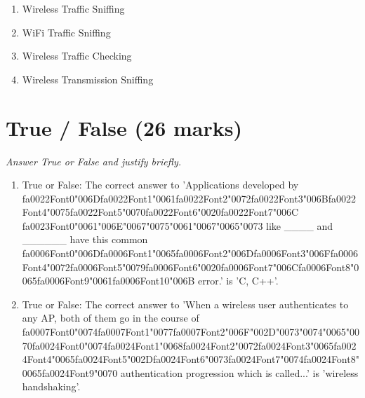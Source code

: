 \documentclass[12pt]{article}
\begin{document}
\begin{enumerate}[label=\arabic*.]
\begin{enumerate}[label=(\alph*)]
    \item Wireless Traffic Sniffing
    \item WiFi Traffic Sniffing
    \item Wireless Traffic Checking
    \item Wireless Transmission Sniffing
\end{enumerate}
\end{enumerate}

\section*{True / False (26 marks)}
\textit{Answer True or False and justify briefly.}
\begin{enumerate}[label=\arabic*.]
\item True or False: The correct answer to 'Applications developed by {\csname fa0022Font0\endcsname\char"006D}{\csname fa0022Font1\endcsname\char"0061}{\csname fa0022Font2\endcsname\char"0072}{\csname fa0022Font3\endcsname\char"006B}{\csname fa0022Font4\endcsname\char"0075}{\csname fa0022Font5\endcsname\char"0070}{\csname fa0022Font6\endcsname\char"0020}{\csname fa0022Font7\endcsname\char"006C} {\csname fa0023Font0\endcsname\char"0061}{\char"006E}{\char"0067}{\char"0075}{\char"0061}{\char"0067}{\char"0065}{\char"0073} like \_\_\_\_ and \_\_\_\_\_\_ have this common {\csname fa0006Font0\endcsname\char"006D}{\csname fa0006Font1\endcsname\char"0065}{\csname fa0006Font2\endcsname\char"006D}{\csname fa0006Font3\endcsname\char"006F}{\csname fa0006Font4\endcsname\char"0072}{\csname fa0006Font5\endcsname\char"0079}{\csname fa0006Font6\endcsname\char"0020}{\csname fa0006Font7\endcsname\char"006C}{\csname fa0006Font8\endcsname\char"0065}{\csname fa0006Font9\endcsname\char"0061}{\csname fa0006Font10\endcsname\char"006B} error.' is 'C, C++'.
\item True or False: The correct answer to 'When a wireless user authenticates to any AP, both of them go in the course of {\csname fa0007Font0\endcsname\char"0074}{\csname fa0007Font1\endcsname\char"0077}{\csname fa0007Font2\endcsname\char"006F}{\char"002D}{\char"0073}{\char"0074}{\char"0065}{\char"0070}{\csname fa0024Font0\endcsname\char"0074}{\csname fa0024Font1\endcsname\char"0068}{\csname fa0024Font2\endcsname\char"0072}{\csname fa0024Font3\endcsname\char"0065}{\csname fa0024Font4\endcsname\char"0065}{\csname fa0024Font5\endcsname\char"002D}{\csname fa0024Font6\endcsname\char"0073}{\csname fa0024Font7\endcsname\char"0074}{\csname fa0024Font8\endcsname\char"0065}{\csname fa0024Font9\endcsname\char"0070} authentication progression which is called...' is 'wireless handshaking'.

\end{enumerate}
\end{document}
